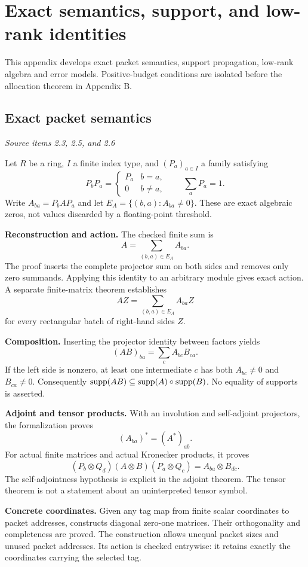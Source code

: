 \clearpage\FloatBarrier\section{Exact semantics, support, and low-rank identities}\label{supp1:section:001}
This appendix develops exact packet semantics, support propagation, low-rank algebra and error models. Positive-budget conditions are isolated before the allocation theorem in Appendix B.\par

\subsection{Exact packet semantics}\label{supp1:subsection:001}\textit{Source items 2.3, 2.5, and 2.6}\par
Let $R$ be a ring, $I$ a finite index type, and $(P_a)_{a\in I}$ a family satisfying
\[
P_bP_a=\begin{cases}P_a&b=a,\\0&b\ne a,\end{cases}
\qquad \sum_aP_a=1.
\]
Write $A_{ba}=P_bAP_a$ and let $E_A=\{(b,a):A_{ba}\ne0\}$. These are exact algebraic zeros, not values discarded by a floating-point threshold.

\textbf{Reconstruction and action.} The checked finite sum is
\[
\boxed{A=\sum_{(b,a)\in E_A} A_{ba}.}
\]
The proof inserts the complete projector sum on both sides and removes only zero summands. Applying this identity to an arbitrary module gives exact action. A separate finite-matrix theorem establishes
\[
AZ=\sum_{(b,a)\in E_A}A_{ba}Z
\]
for every rectangular batch of right-hand sides $Z$.

\textbf{Composition.} Inserting the projector identity between factors yields
\[
\boxed{(AB)_{ba}=\sum_c A_{bc}B_{ca}.}
\]
If the left side is nonzero, at least one intermediate $c$ has both $A_{bc}\ne0$ and $B_{ca}\ne0$. Consequently $\operatorname{supp}(AB)\subseteq\operatorname{supp}(A)\circ\operatorname{supp}(B)$. No equality of supports is asserted.

\textbf{Adjoint and tensor products.} With an involution and self-adjoint projectors, the formalization proves
\[
(A_{ba})^*=(A^*)_{ab}.
\]
For actual finite matrices and actual Kronecker products, it proves
\[
(P_b\otimes Q_d)(A\otimes B)(P_a\otimes Q_c)
=A_{ba}\otimes B_{dc}.
\]
The self-adjointness hypothesis is explicit in the adjoint theorem. The tensor theorem is not a statement about an uninterpreted tensor symbol.

\textbf{Concrete coordinates.} Given any tag map from finite scalar coordinates to packet addresses,  constructs diagonal zero-one matrices. Their orthogonality and completeness are proved. The construction allows unequal packet sizes and unused packet addresses. Its action is checked entrywise: it retains exactly the coordinates carrying the selected tag.

